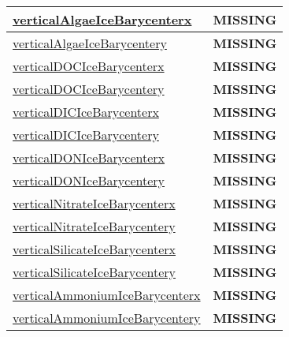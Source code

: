 {\begin{center}
\begin{longtable}{| p{2.0in} | p{4.0in} |}
    \hline
    \hyperref[subsec:var_sec_tracer_barycenter_verticalAlgaeIceBarycenterx]{verticalAlgaeIceBarycenterx} & {\bf \color{red} MISSING} \\
    \hline
    \hyperref[subsec:var_sec_tracer_barycenter_verticalAlgaeIceBarycentery]{verticalAlgaeIceBarycentery} & {\bf \color{red} MISSING} \\
    \hline
    \hyperref[subsec:var_sec_tracer_barycenter_verticalDOCIceBarycenterx]{verticalDOCIceBarycenterx} & {\bf \color{red} MISSING} \\
    \hline
    \hyperref[subsec:var_sec_tracer_barycenter_verticalDOCIceBarycentery]{verticalDOCIceBarycentery} & {\bf \color{red} MISSING} \\
    \hline
    \hyperref[subsec:var_sec_tracer_barycenter_verticalDICIceBarycenterx]{verticalDICIceBarycenterx} & {\bf \color{red} MISSING} \\
    \hline
    \hyperref[subsec:var_sec_tracer_barycenter_verticalDICIceBarycentery]{verticalDICIceBarycentery} & {\bf \color{red} MISSING} \\
    \hline
    \hyperref[subsec:var_sec_tracer_barycenter_verticalDONIceBarycenterx]{verticalDONIceBarycenterx} & {\bf \color{red} MISSING} \\
    \hline
    \hyperref[subsec:var_sec_tracer_barycenter_verticalDONIceBarycentery]{verticalDONIceBarycentery} & {\bf \color{red} MISSING} \\
    \hline
    \hyperref[subsec:var_sec_tracer_barycenter_verticalNitrateIceBarycenterx]{verticalNitrateIceBarycenterx} & {\bf \color{red} MISSING} \\
    \hline
    \hyperref[subsec:var_sec_tracer_barycenter_verticalNitrateIceBarycentery]{verticalNitrateIceBarycentery} & {\bf \color{red} MISSING} \\
    \hline
    \hyperref[subsec:var_sec_tracer_barycenter_verticalSilicateIceBarycenterx]{verticalSilicateIceBarycenterx} & {\bf \color{red} MISSING} \\
    \hline
    \hyperref[subsec:var_sec_tracer_barycenter_verticalSilicateIceBarycentery]{verticalSilicateIceBarycentery} & {\bf \color{red} MISSING} \\
    \hline
    \hyperref[subsec:var_sec_tracer_barycenter_verticalAmmoniumIceBarycenterx]{verticalAmmoniumIceBarycenterx} & {\bf \color{red} MISSING} \\
    \hline
    \hyperref[subsec:var_sec_tracer_barycenter_verticalAmmoniumIceBarycentery]{verticalAmmoniumIceBarycentery} & {\bf \color{red} MISSING} \\

\end{longtable}
\end{center}}
